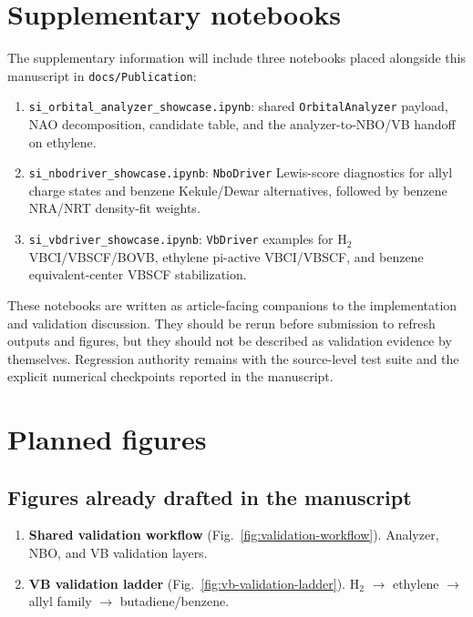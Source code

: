 \documentclass[11pt]{article}
\begin{document}
\section{Supplementary notebooks}

The supplementary information will include three notebooks placed alongside this manuscript in \texttt{docs/Publication}:
\begin{enumerate}[leftmargin=*]
	\item \texttt{si\_orbital\_analyzer\_showcase.ipynb}: shared \texttt{OrbitalAnalyzer} payload, NAO decomposition, candidate table, and the analyzer-to-NBO/VB handoff on ethylene.
	\item \texttt{si\_nbodriver\_showcase.ipynb}: \texttt{NboDriver} Lewis-score diagnostics for allyl charge states and benzene Kekule/Dewar alternatives, followed by benzene NRA/NRT density-fit weights.
	\item \texttt{si\_vbdriver\_showcase.ipynb}: \texttt{VbDriver} examples for H$_2$ VBCI/VBSCF/BOVB, ethylene pi-active VBCI/VBSCF, and benzene equivalent-center VBSCF stabilization.
\end{enumerate}
These notebooks are written as article-facing companions to the implementation and validation discussion.  They should be rerun before submission to refresh outputs and figures, but they should not be described as validation evidence by themselves.  Regression authority remains with the source-level test suite and the explicit numerical checkpoints reported in the manuscript.

\section{Planned figures}

\subsection*{Figures already drafted in the manuscript}

\begin{enumerate}[leftmargin=*]
	\item \textbf{Shared validation workflow} (Fig.~\ref{fig:validation-workflow}). Analyzer, NBO, and VB validation layers.
	\item \textbf{VB validation ladder} (Fig.~\ref{fig:vb-validation-ladder}). H$_2$ $\rightarrow$ ethylene $\rightarrow$ allyl family $\rightarrow$ butadiene/benzene.
\end{enumerate}
\end{document}
